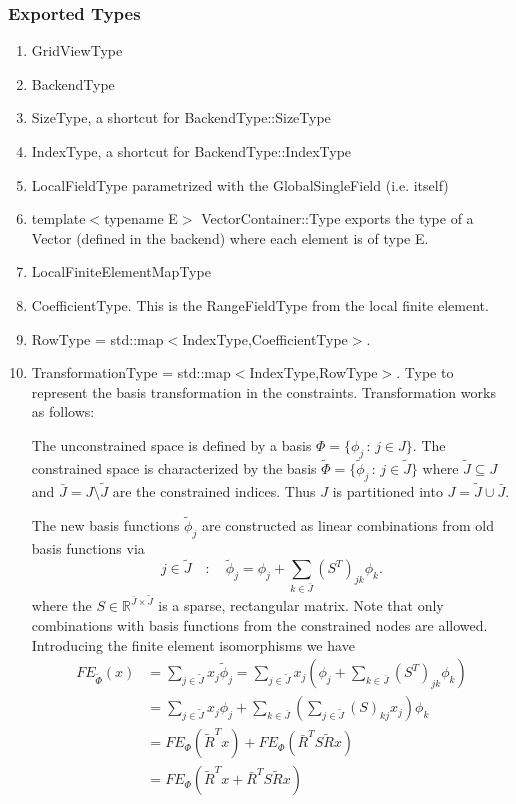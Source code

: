 \documentclass[11pt,a4paper,DIV11,%
notitlepage,oneside,abstracton,%
bibtotoc]{scrartcl}
\begin{document}
\subsubsection{Exported Types}

\begin{enumerate}[1)]
\item GridViewType
\item BackendType
\item SizeType, a shortcut for BackendType::SizeType
\item IndexType, a shortcut for BackendType::IndexType
\item LocalFieldType parametrized with the GlobalSingleField (i.e. itself)
\item template$<$typename E$>$ VectorContainer::Type exports the type of a Vector
  (defined in the backend) where each element is of type E.
\item LocalFiniteElementMapType
\item CoefficientType. This is the RangeFieldType from the local finite element.
\item RowType = std::map$<$IndexType,CoefficientType$>$.
\item TransformationType = std::map$<$IndexType,RowType$>$. Type to
  represent the basis transformation in the
  constraints. Transformation works as follows:

  The unconstrained space is defined by a basis
  $\Phi=\{\phi_j\,:\,j\in J\}$. The constrained space is characterized
  by the basis $\tilde\Phi=\{\tilde\phi_j\,:\,j\in \tilde{J}\}$ where
  $\tilde{J}\subseteq J$ and $\bar{J}=J\setminus\tilde{J}$ are the
  constrained indices. Thus $J$ is partitioned into $J =
  \tilde{J}\cup\bar{J}$. 

  The new basis functions $\tilde{\phi}_j$ are constructed as linear
  combinations from old basis functions via
  \begin{equation}
    j\in\tilde{J} \quad : \quad \tilde\phi_j = \phi_j +
    \sum_{k\in\bar{J}} (S^T)_{jk} \phi_k.
  \end{equation} 
  where the $S\in\mathbb{R}^{\bar{J}\times\tilde{J}}$ is a sparse,
  rectangular matrix. 
  Note that only combinations with basis functions from the
  constrained nodes are allowed. Introducing the finite element
  isomorphisms we have
\begin{equation}
\begin{split}
FE_{\tilde\Phi}(x) &= \sum_{j\in\tilde{J}} x_j \tilde\phi_j = 
\sum_{j\in\tilde{J}} x_j\left(\phi_j +
    \sum_{k\in\bar{J}} (S^T)_{jk} \phi_k\right)\\
&= \sum_{j\in\tilde{J}} x_j\phi_j + \sum_{k\in\bar{J}} \left(
    \sum_{j\in\tilde{J}} (S)_{kj} x_j\right) \phi_k \\
&= FE_{\Phi}(\tilde{R}^T x) + FE_{\Phi}(\bar{R}^TS\tilde{R}x )\\
&= FE_{\Phi}(\tilde{R}^T x + \bar{R}^TS\tilde{R}x)
\end{split}
\end{equation}
\end{enumerate}
\end{document}
